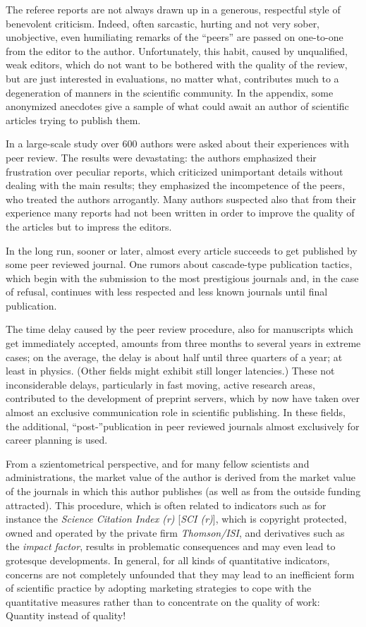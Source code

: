 The referee reports are not always drawn up in a generous, respectful
style of benevolent criticism.  Indeed, often sarcastic, hurting and not
very sober, unobjective, even humiliating remarks of the ``peers'' are
passed on one-to-one from the editor to the author.  Unfortunately, this
habit, caused by unqualified, weak editors, which do not want to be bothered with
the quality of the review, but are just interested in evaluations, no
matter what, contributes much to a degeneration of manners in the
scientific community.  In the appendix, some anonymized anecdotes give a
sample of what could await an author of scientific articles trying to
publish them.

In a large-scale study \cite{1981-bradley} over 600 authors were asked  about
their experiences with peer review.  The results were devastating:  the authors
emphasized their frustration over peculiar reports, which criticized
unimportant details without dealing with the main results; they
emphasized the incompetence of the peers, who treated the authors
arrogantly.  Many authors suspected also that from their experience many
reports had not been written in order to improve the quality of the
articles but to impress the editors.

In the long run, sooner or later, almost every article succeeds to get
published by some peer reviewed journal.  One rumors about cascade-type
publication tactics, which begin with the submission to the most
prestigious journals and, in the case of refusal, continues with
less respected and less known journals  until final publication.

The time delay caused by the peer review procedure, also for manuscripts
which get immediately accepted, amounts from three months to several
years in extreme cases; on the average, the delay is about half until
three quarters of a year; at least in physics.  (Other fields might exhibit
still longer latencies.)  These not inconsiderable delays,
particularly in fast moving, active research areas, contributed
to the  development
of preprint servers, which by now have taken over almost an exclusive communication role
in scientific publishing.  In these fields, the additional,
``post-''publication in peer reviewed journals almost
exclusively for career planning is used.

From a szientometrical perspective, and for many fellow scientists and
administrations, the market value of the author is derived from the
market value of the journals in which this author publishes (as well as
from the outside funding attracted).  This procedure, which is often
related to indicators such as for instance the {\it Science Citation
Index (r)} [{\it SCI (r)}], which is copyright protected, owned and
operated by the private firm {\it Thomson/ISI}, and derivatives such as
the {\it impact factor}, results in problematic consequences and may
even lead to grotesque developments.  In general, for all kinds of quantitative
indicators, concerns are not completely unfounded that they
may lead to an inefficient form of scientific practice by adopting
marketing strategies to cope with the quantitative measures rather than
to concentrate on the quality of work:  Quantity instead of quality!

